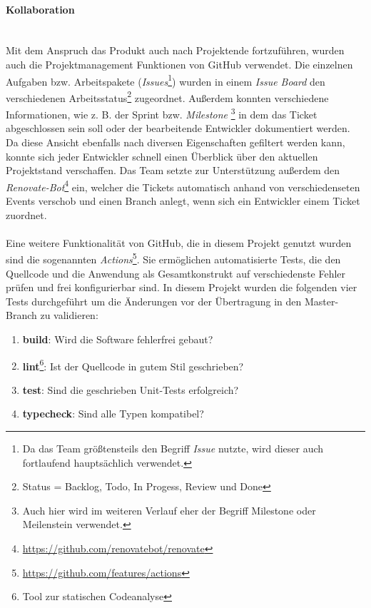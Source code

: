 \documentclass[10pt, a4paper]{article}
\begin{document}
\begin{onehalfspace}
      \paragraph{Kollaboration} $~$ \\
      Mit dem Anspruch das Produkt auch nach Projektende fortzuführen, wurden auch die Projektmanagement Funktionen von GitHub verwendet. Die einzelnen Aufgaben bzw. Arbeitspakete (\textit{Issues}\footnote{Da das Team größtensteils den Begriff \textit{Issue} nutzte, wird dieser auch fortlaufend hauptsächlich verwendet.}) wurden in einem \textit{Issue Board} den verschiedenen Arbeitsstatus\footnote{Status = Backlog, Todo, In Progess, Review und Done}
      zugeordnet. Außerdem konnten verschiedene Informationen, wie z. B. der Sprint bzw. \textit{Milestone} \footnote{Auch hier wird im weiteren Verlauf eher der Begriff Milestone oder Meilenstein verwendet.} in dem das Ticket abgeschlossen sein soll oder der bearbeitende Entwickler dokumentiert werden.
      Da diese Ansicht ebenfalls nach diversen Eigenschaften gefiltert werden kann, konnte sich jeder Entwickler schnell einen Überblick über den aktuellen Projektstand verschaffen.
      Das Team setzte zur Unterstützung außerdem den \textit{Renovate-Bot}\footnote{\raggedright\url{https://github.com/renovatebot/renovate}} ein, welcher die Tickets automatisch anhand von verschiedenseten Events verschob und einen Branch anlegt, wenn sich ein Entwickler einem Ticket zuordnet.
      \\~\\
      Eine weitere Funktionalität von GitHub, die in diesem Projekt genutzt wurden sind die sogenannten \textit{Actions}\footnote{\raggedright\url{https://github.com/features/actions}}.
      Sie ermöglichen automatisierte Tests, die den Quellcode und die Anwendung als Gesamtkonstrukt auf verschiedenste Fehler prüfen und frei konfigurierbar sind.
      In diesem Projekt wurden die folgenden vier Tests durchgeführt um die Änderungen vor der Übertragung in den Master-Branch zu validieren:
      \begin{enumerate}
        \item \textbf{build}: Wird die Software fehlerfrei gebaut?
        \item \textbf{lint}\footnote{Tool zur statischen Codeanalyse}: Ist der Quellcode in gutem Stil geschrieben?
        \item \textbf{test}: Sind die geschrieben Unit-Tests erfolgreich?
        \item \textbf{typecheck}: Sind alle Typen kompatibel?

\end{enumerate}
\end{onehalfspace}
\end{document}
